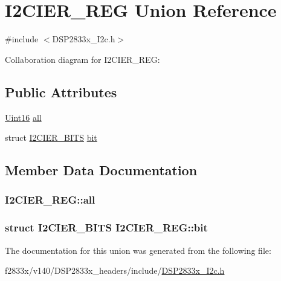 \hypertarget{union_i2_c_i_e_r___r_e_g}{}\section{I2\+C\+I\+E\+R\+\_\+\+R\+E\+G Union Reference}
\label{union_i2_c_i_e_r___r_e_g}


{\ttfamily \#include $<$D\+S\+P2833x\+\_\+\+I2c.\+h$>$}



Collaboration diagram for I2\+C\+I\+E\+R\+\_\+\+R\+E\+G\+:
\subsection*{Public Attributes}
\begin{DoxyCompactItemize}
\item 
\hyperlink{_d_s_p2833x___device_8h_a59a9f6be4562c327cbfb4f7e8e18f08b}{Uint16} \hyperlink{union_i2_c_i_e_r___r_e_g_a5c85d2a6397cd14939f7f55dc31dd461}{all}
\item 
struct \hyperlink{struct_i2_c_i_e_r___b_i_t_s}{I2\+C\+I\+E\+R\+\_\+\+B\+I\+T\+S} \hyperlink{union_i2_c_i_e_r___r_e_g_a436b7b2b57ee50f0954539af5c44d109}{bit}
\end{DoxyCompactItemize}


\subsection{Member Data Documentation}
\hypertarget{union_i2_c_i_e_r___r_e_g_a5c85d2a6397cd14939f7f55dc31dd461}{}
\subsubsection[{all}]{ I2\+C\+I\+E\+R\+\_\+\+R\+E\+G\+::all}\label{union_i2_c_i_e_r___r_e_g_a5c85d2a6397cd14939f7f55dc31dd461}
\hypertarget{union_i2_c_i_e_r___r_e_g_a436b7b2b57ee50f0954539af5c44d109}{}
\subsubsection[{bit}]{\setlength{\rightskip}{0pt plus 5cm}struct {\bf I2\+C\+I\+E\+R\+\_\+\+B\+I\+T\+S} I2\+C\+I\+E\+R\+\_\+\+R\+E\+G\+::bit}\label{union_i2_c_i_e_r___r_e_g_a436b7b2b57ee50f0954539af5c44d109}


The documentation for this union was generated from the following file\+:\begin{DoxyCompactItemize}
\item 
f2833x/v140/\+D\+S\+P2833x\+\_\+headers/include/\hyperlink{_d_s_p2833x___i2c_8h}{D\+S\+P2833x\+\_\+\+I2c.\+h}\end{DoxyCompactItemize}
